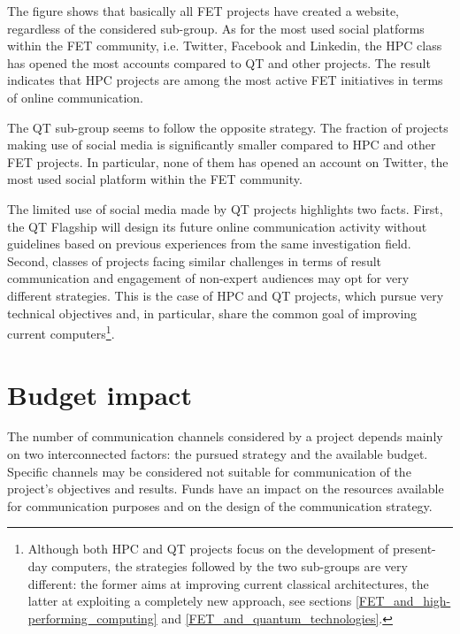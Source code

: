 The figure shows that basically all FET projects have created a website, regardless of the considered sub-group. As for the most used social platforms within the FET community, i.e. Twitter, Facebook and Linkedin, the HPC class has opened the most accounts compared to QT and other projects. The result indicates that HPC projects are among the most active FET initiatives in terms of online communication.  

The QT sub-group seems to follow the opposite strategy. The fraction of projects making use of social media is significantly smaller compared to HPC and other FET projects. In particular, none of them has opened an account on Twitter, the most used social platform within the FET community. 

The limited use of social media made by QT projects highlights two facts. First, the QT Flagship will design its future online communication activity without guidelines based on previous experiences from the same investigation field. Second, classes of projects facing similar challenges in terms of result communication and engagement of non-expert audiences may opt for very different strategies. This is the case of HPC and QT projects, which pursue very technical objectives and, in particular, share the common goal of improving current computers\footnote{Although both HPC and QT projects focus on the development of present-day computers, the strategies followed by the two sub-groups are very different: the former aims at improving current classical architectures, the latter at exploiting a completely new approach, see sections \ref{FET_and_high-performing_computing} and \ref{FET_and_quantum_technologies}.}.


\section{Budget impact}
The number of communication channels considered by a project depends mainly on two interconnected factors: the pursued strategy and the available budget. Specific channels may be considered not suitable for communication of the project's objectives and results. Funds have an impact on the resources available for communication purposes and on the design of the communication strategy.

